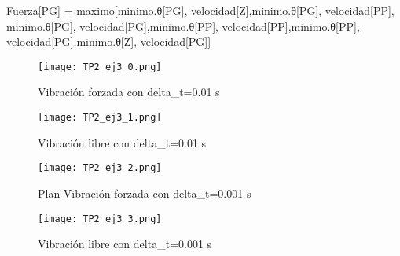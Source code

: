 \documentclass{article}
\begin{document}
Fuerza[PG] = maximo[minimo.θ[PG], velocidad[Z],minimo.θ[PG], velocidad[PP],\\minimo.θ[PG], velocidad[PG],minimo.θ[PP], velocidad[PP],minimo.θ[PP], velocidad[PG],minimo.θ[Z], velocidad[PG]]\\

\begin{figure}[ht]
    \centering
    \texttt{[image: TP2\_ej3\_0.png]}
    \caption{Vibración forzada con delta_t=0.01 s}
    \label{fig:TP2_ej3_0}
\end{figure}

\begin{figure}[ht]
    \centering
    \texttt{[image: TP2\_ej3\_1.png]}
    \caption{Vibración libre con delta_t=0.01 s}
    \label{fig:TP2_ej3_1}
\end{figure}

\begin{figure}[ht]
    \centering
    \texttt{[image: TP2\_ej3\_2.png]}
    \caption{Plan Vibración forzada con delta_t=0.001 s}
    \label{fig:TP2_ej3_2}
\end{figure}

\begin{figure}[ht]
    \centering
    \texttt{[image: TP2\_ej3\_3.png]}
    \caption{Vibración libre con delta_t=0.001 s}
    \label{fig:TP2_ej3_3}
\end{figure}
\end{document}
